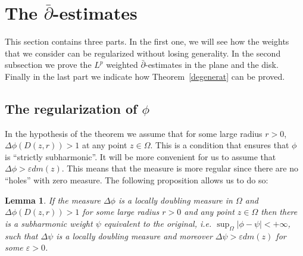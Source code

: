 \documentclass[12pt,twoside,final,psamsfonts]{amsart}
\theoremstyle{plain}
\newtheorem{lema}{Lemma}
\theoremstyle{remark}
\theoremstyle{definition}
\begin{document}
\section{The $\bar\partial$-estimates}\label{demostracions}
This section contains three parts. In the first one, we will see how the
weights that we consider can be regularized without losing generality. In the
second subsection we prove the $L^p$ weighted $\bar\partial$-estimates in the
plane and the disk. Finally in the last part we indicate how
Theorem~\ref{degenerat} can be proved.

\subsection{The regularization of $\phi$}
In the hypothesis of the theorem we assume that for 
some large radius $r>0$, $\Delta \phi(D(z,r))>1$  at any point $z\in\Omega$. 
This is a condition that 
ensures that $\phi$ is ``strictly subharmonic''. It will be more convenient for
us to assume that $\Delta\phi >\varepsilon dm(z)$. This means that the measure
is  more regular since there are no ``holes'' with zero measure. The following 
proposition allows us to do so:

\begin{lema}
If the measure $\Delta\phi$ is a locally 
doubling measure in $\Omega$  and $\Delta
\phi(D(z,r))>1$ for  some large radius $r>0$ and any point $z\in\Omega$ then
there is a subharmonic  weight $\psi$ equivalent to the original, i.e.
$\sup_\Omega |\phi-\psi|<+\infty$,  such that $\Delta \psi$ is a locally 
doubling
measure and moreover  $\Delta\psi >\varepsilon dm(z)$ for some $\varepsilon>0$.
\end{lema}
\end{document}
